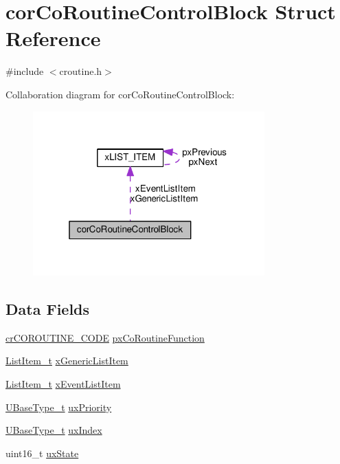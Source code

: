 \hypertarget{structcorCoRoutineControlBlock}{}\section{cor\+Co\+Routine\+Control\+Block Struct Reference}
\label{structcorCoRoutineControlBlock}


{\ttfamily \#include $<$croutine.\+h$>$}



Collaboration diagram for cor\+Co\+Routine\+Control\+Block\+:\nopagebreak
\begin{figure}[H]
\begin{center}
\leavevmode
\includegraphics[width=253pt]{d4/d83/structcorCoRoutineControlBlock__coll__graph}
\end{center}
\end{figure}
\subsection*{Data Fields}
\begin{DoxyCompactItemize}
\item 
\hyperlink{croutine_8h_a397a7505718dd366d8411ce324c49758}{cr\+C\+O\+R\+O\+U\+T\+I\+N\+E\+\_\+\+C\+O\+DE} \hyperlink{structcorCoRoutineControlBlock_acc98c7364cd88e8e034a5f9bba113832}{px\+Co\+Routine\+Function}
\item 
\hyperlink{list_8h_a1a62d469392f9bfe2443e7efab9c8398}{List\+Item\+\_\+t} \hyperlink{structcorCoRoutineControlBlock_aa2900494db8782eeb8ef12d482501406}{x\+Generic\+List\+Item}
\item 
\hyperlink{list_8h_a1a62d469392f9bfe2443e7efab9c8398}{List\+Item\+\_\+t} \hyperlink{structcorCoRoutineControlBlock_a105d316da0069f766acc3b210afed1b9}{x\+Event\+List\+Item}
\item 
\hyperlink{portmacro_8h_a646f89d4298e4f5afd522202b11cb2e6}{U\+Base\+Type\+\_\+t} \hyperlink{structcorCoRoutineControlBlock_a752101a5d41b5caa7fd5149436613c8f}{ux\+Priority}
\item 
\hyperlink{portmacro_8h_a646f89d4298e4f5afd522202b11cb2e6}{U\+Base\+Type\+\_\+t} \hyperlink{structcorCoRoutineControlBlock_a6c185cd2145f562fb570bea9b158fc81}{ux\+Index}
\item 
uint16\+\_\+t \hyperlink{structcorCoRoutineControlBlock_aa0d702ff5a23c61598fe13e5a78fb1dc}{ux\+State}
\end{DoxyCompactItemize}


